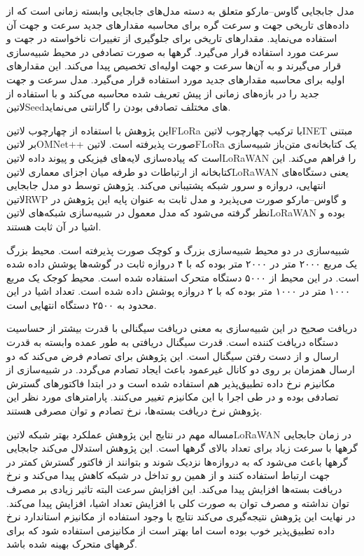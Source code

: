 مدل جابجایی گاوس--مارکو متعلق به دسته مدل‌های جابجایی وابسته زمانی است که از داده‌های تاریخی جهت و سرعت گره برای محاسبه
مقدارهای جدید سرعت و جهت آن استفاده می‌نماید. مقدارهای تاریخی برای جلوگیری از تغییرات ناخواسته در جهت و سرعت مورد استفاده قرار می‌گیرد.
گرهها به صورت تصادفی در محیط شبیه‌سازی قرار می‌گیرند و به آن‌ها سرعت و جهت اولیه‌ای تخصیص پیدا می‌کند.
این مقدارهای اولیه برای محاسبه مقدارهای جدید مورد استفاده قرار می‌گیرد.
مدل سرعت و جهت جدید را در بازه‌های زمانی از پیش تعریف شده محاسبه می‌کند و با استفاده از ‌لاتین{Seed}های مختلف تصادفی بودن را گارانتی می‌نماید.

این پژوهش با استفاده از چهارچوب ‌لاتین{FLoRa} با ترکیب چهارچوب ‌لاتین{INET} مبتنی بر ‌لاتین{OMNet++} صورت پذیرفته است.
‌لاتین{FLoRa} یک کتابخانه‌ی متن‌باز شبیه‌سازی است که پیاده‌سازی لایه‌های فیزیکی و پیوند داده ‌لاتین{LoRaWAN} را فراهم می‌کند.
این کتابخانه از ارتباطات دو طرفه میان اجزای معماری ‌لاتین{LoRaWAN} یعنی دستگاه‌های انتهایی، دروازه و سرور شبکه پشتیبانی می‌کند.
پژوهش توسط دو مدل جابجایی ‌لاتین{RWP} و گاوس--مارکو صورت می‌پذیرد و مدل ثابت به عنوان پایه این پژوهش در نظر گرفته می‌شود که مدل معمول
در شبیه‌سازی شبکه‌های ‌لاتین{LoRaWAN} بوده و اشیا در آن ثابت هستند.

شبیه‌سازی در دو محیط شبیه‌سازی بزرگ و کوچک صورت پذیرفته است. محیط بزرگ یک مربع ۲۰۰۰ متر در ۲۰۰۰ متر بوده که با ۴ دروازه
ثابت در گوشه‌ها پوشش داده شده است. در این محیط از ۵۰۰۰ دستگاه متحرک استفاده شده است.
محیط کوجک یک مربع ۱۰۰۰ متر در ۱۰۰۰ متر بوده که با ۲ دروازه پوشش داده شده است.
تعداد اشیا در این محدود به ۲۵۰۰ دستگاه انتهایی است.

دریافت صحیح در این شبیه‌سازی به معنی دریافت سیگنالی با قدرت بیشتر از حساسیت دستگاه دریافت کننده است.
قدرت سیگنال دریافتی به طور عمده وابسته به قدرت ارسال و از دست رفتن سیگنال است.
این پژوهش برای تصادم فرض می‌کند که دو ارسال همزمان بر روی دو کانال غیرعمود باعث ایجاد تصادم می‌گردد.
در شبیه‌سازی از مکانیزم نرخ داده تطبیق‌پذیر هم استفاده شده است و در ابتدا فاکتورهای گسترش تصادفی بوده و در طی اجرا با این مکانیزم
تغییر می‌کنند. پارامترهای مورد نظر این پژوهش نرخ دریافت بسته‌ها، نرخ تصادم و توان مصرفی هستند.

مساله مهم در نتایج این پژوهش عملکرد بهتر شبکه ‌لاتین{LoRaWAN} در زمان جابجایی گرهها با سرعت زیاد برای تعداد بالای گرهها است.
این پژوهش استدلال می‌کند جابجایی گرهها باعث می‌شود که به دروازه‌ها نزدیک شوند و بتوانند از فاکتور گسترش
کمتر در جهت ارتباط استفاده کنند و از همین رو تداخل در شبکه کاهش پیدا می‌کند و نرخ دریافت بسته‌ها افزایش پیدا می‌کند.
این افزایش سرعت البته تاثیر زیادی بر مصرف توان نداشته و مصرف توان به صورت کلی با افزایش تعداد اشیا، افزایش پیدا می‌کند.
در نهایت این پژوهش نتیجه‌گیری می‌کند نتایج با وجود استفاده از مکانیزم استاندارد نرخ داده تطبیق‌پذیر خوب بوده است اما
بهتر است از مکانیزمی استفاده شود که برای گرههای متحرک بهینه شده باشد.

